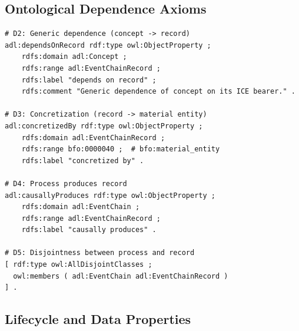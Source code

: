 \subsection{Ontological Dependence Axioms}

\begin{lstlisting}[language=turtle, caption={Dependence axioms D2--D5 in OWL.}, label={lst:owl-dl-dependence}]
# D2: Generic dependence (concept -> record)
adl:dependsOnRecord rdf:type owl:ObjectProperty ;
    rdfs:domain adl:Concept ;
    rdfs:range adl:EventChainRecord ;
    rdfs:label "depends on record" ;
    rdfs:comment "Generic dependence of concept on its ICE bearer." .

# D3: Concretization (record -> material entity)
adl:concretizedBy rdf:type owl:ObjectProperty ;
    rdfs:domain adl:EventChainRecord ;
    rdfs:range bfo:0000040 ;  # bfo:material_entity
    rdfs:label "concretized by" .

# D4: Process produces record
adl:causallyProduces rdf:type owl:ObjectProperty ;
    rdfs:domain adl:EventChain ;
    rdfs:range adl:EventChainRecord ;
    rdfs:label "causally produces" .

# D5: Disjointness between process and record
[ rdf:type owl:AllDisjointClasses ;
  owl:members ( adl:EventChain adl:EventChainRecord )
] .
\end{lstlisting}

\subsection{Lifecycle and Data Properties}


